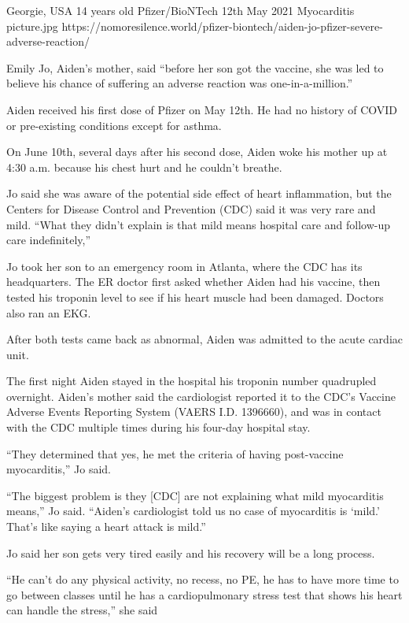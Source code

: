           {Georgie, USA}
          {14 years old}
          {Pfizer/BioNTech}
          {12th May 2021}
          {Myocarditis}
          {picture.jpg}
          {https://nomoresilence.world/pfizer-biontech/aiden-jo-pfizer-severe-adverse-reaction/}
          {

\normalsize

Emily Jo, Aiden’s mother, said “before her son got the vaccine, she was led to
believe his chance of suffering an adverse reaction was one-in-a-million.”

Aiden received his first dose of Pfizer on May 12th. He had no history of COVID
or pre-existing conditions except for asthma.

On June 10th, several days after his second dose, Aiden woke his mother up at
4:30 a.m. because his chest hurt and he couldn’t breathe.

Jo said she was aware of the potential side effect of heart inflammation, but
the Centers for Disease Control and Prevention (CDC) said it was very rare and
mild. “What they didn’t explain is that mild means hospital care and follow-up
care indefinitely,”

Jo took her son to an emergency room in Atlanta, where the CDC has its
headquarters. The ER doctor first asked whether Aiden had his vaccine, then
tested his troponin level to see if his heart muscle had been damaged. Doctors
also ran an EKG.

After both tests came back as abnormal, Aiden was admitted to the acute cardiac
unit.

The first night Aiden stayed in the hospital his troponin number quadrupled
overnight. Aiden’s mother said the cardiologist reported it to the CDC’s Vaccine
Adverse Events Reporting System (VAERS I.D. 1396660), and was in contact with
the CDC multiple times during his four-day hospital stay.

“They determined that yes, he met the criteria of having post-vaccine
myocarditis,” Jo said.

“The biggest problem is they [CDC] are not explaining what mild myocarditis
means,” Jo said. “Aiden’s cardiologist told us no case of myocarditis is ‘mild.’
That’s like saying a heart attack is mild.”

Jo said her son gets very tired easily and his recovery will be a long process.

“He can’t do any physical activity, no recess, no PE, he has to have more time
to go between classes until he has a cardiopulmonary stress test that shows his
heart can handle the stress,” she said

}
